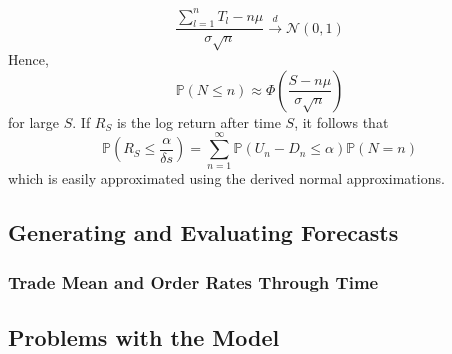 \documentclass[a4paper,10pt]{article}
\begin{document}
\begin{equation}
\frac{\sum_{l=1}^n T_l - n\mu}{\sigma \sqrt{n}} \xrightarrow{d} \mathcal{N}(0, 1)
\end{equation}
Hence,
\begin{equation}
\mathbb{P}(N \leq n) \approx \Phi\left(\frac{S - n\mu}{\sigma \sqrt{n}} \right)
\end{equation}
for large $S$. If $R_S$ is the log return after time $S$, it follows that
\begin{equation}
\mathbb{P}\left(R_S \leq \frac{\alpha}{\delta s}\right) = \sum_{n=1}^{\infty} \mathbb{P}\left(U_n - D_n \leq \alpha\right)\mathbb{P}(N = n)
\end{equation}
which is easily approximated using the derived normal approximations.
\subsection{Generating and Evaluating Forecasts}
\subsubsection{Trade Mean and Order Rates Through Time}
\subsection{Problems with the Model}
\end{document}
